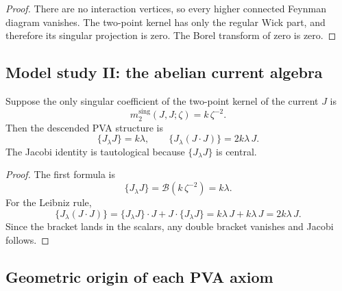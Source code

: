 \begin{proof}
There are no interaction vertices, so every higher connected Feynman diagram vanishes.
The two-point kernel has only the regular Wick part, and therefore its singular
projection is zero. The Borel transform of zero is zero.
\end{proof}

\subsection{Model study II: the abelian current algebra}

\begin{proposition}
\label{prop:abelian-study}
Suppose the only singular coefficient of the two-point kernel of the current $J$ is
\[
m_2^{\mathrm{sing}}(J,J;\zeta)=k\,\zeta^{-2}.
\]
Then the descended PVA structure is
\[
\{J_\lambda J\}=k\lambda,
\qquad
\{J_\lambda (J\cdot J)\}=2k\lambda\,J.
\]
The Jacobi identity is tautological because $\{J_\lambda J\}$ is central.
\end{proposition}

\begin{proof}
The first formula is
\[
\{J_\lambda J\}
=
\mathcal B(k\,\zeta^{-2})
=
k\lambda.
\]
For the Leibniz rule,
\[
\{J_\lambda(J\cdot J)\}
=
\{J_\lambda J\}\cdot J + J\cdot\{J_\lambda J\}
=
k\lambda\,J + k\lambda\,J
=
2k\lambda\,J.
\]
Since the bracket lands in the scalars, any double bracket vanishes and Jacobi follows.
\end{proof}

\subsection{Geometric origin of each PVA axiom}

